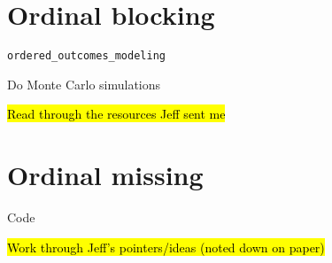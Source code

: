 \section*{Ordinal blocking}
	\begin{coi}
		\item \texttt{ordered\_outcomes\_modeling}
			\begin{coi}
				\item Do Monte Carlo simulations
					\begin{coi}
						\item \hl{Read through the resources Jeff sent me}
					\end{coi}
			\end{coi}
	\end{coi}
	
\section*{Ordinal missing}
	\begin{coi}
		\item Code
			\begin{coi}
				\item \hl{Work through Jeff's pointers/ideas (noted down on paper)}
			\end{coi}
	\end{coi}


	




